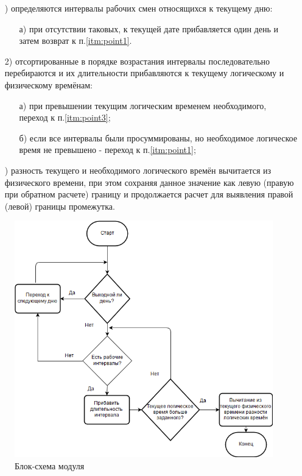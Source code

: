 \begin{enumerate}
	\item[\mylabel{itm:point1}{1})] определяются интервалы рабочих смен относящихся к текущему дню:
	      \begin{enumerate}
		      \item[а)] при отсутствии таковых, к текущей дате прибавляется один день и затем возврат к п.\ref{itm:point1}.
	      \end{enumerate}
	\item[2)] отсортированные в порядке возрастания интервалы последовательно перебираются и их длительности прибавляются к текущему логическому и физическому времёнам:
	      \begin{enumerate}
		      \item[а)] при превышении текущим логическим временем необходимого, переход к п.\ref{itm:point3};
		      \item[б)] если все интервалы были просуммированы, но необходимое логическое время не превышено - переход к п.\ref{itm:point1};
	      \end{enumerate}
	\item[\mylabel{itm:point3}{3})] разность текущего и необходимого логического времён вычитается из физического времени, при этом сохраняя данное значение как левую (правую при обратном расчете) границу и продолжается расчет для выявления правой (левой) границы промежутка.
\end{enumerate}

\begin{figure}[ht]
	\centering
	\includegraphics[width=\linewidth]{pics/scheduleSchema.png}
	\caption{Блок-схема модуля}
	\label{fig:schema}
\end{figure}

